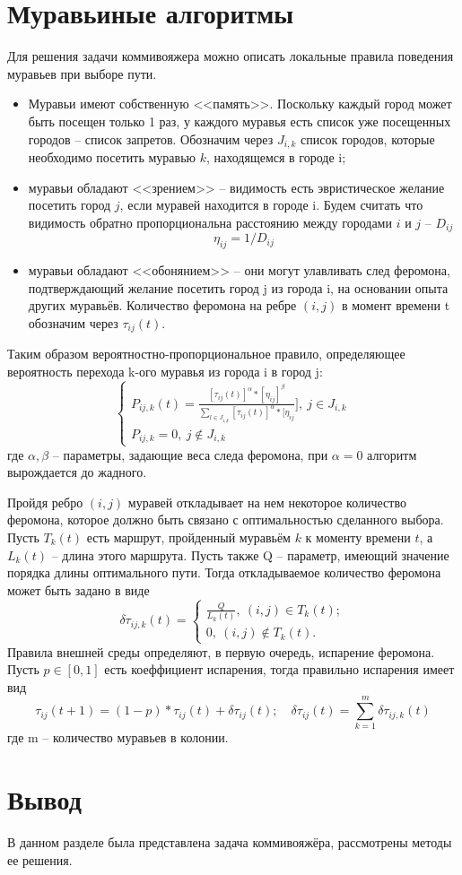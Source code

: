 \section{Муравьиные алгоритмы}
\label{sec:ants}
Для решения задачи коммивояжера можно описать  локальные правила поведения муравьев при выборе пути.
\begin{itemize}
	\item Муравьи имеют собственную <<память>>. Поскольку каждый город может быть посещен только 1 раз, у каждого муравья есть список уже посещенных городов -- список запретов. Обозначим через $J_{i,k}$ список городов, которые необходимо посетить муравью $k$, находящемся в городе i;
	\item муравьи обладают <<зрением>>  -- видимость есть эвристическое желание посетить город $j$, если муравей находится в городе i. Будем считать что видимость обратно пропорциональна расстоянию между городами $i$ и $j$ -- $D_{ij}$
	\begin{equation}
		\eta_{ij}=1/D_{ij}
	\end{equation}
	\item муравьи обладают <<обонянием>> -- они могут улавливать след феромона, подтверждающий желание посетить город j из города i, на основании опыта других муравьёв. Количество феромона на ребре $(i,j)$ в момент времени t обозначим через $\tau_{ij}(t)$.
\end{itemize}
\par Таким образом вероятностно-пропорциональное правило, определяющее вероятность перехода k-ого муравья из города i в город j:
\begin{equation}
	\begin{cases}
		P_{ij,k}(t)=\frac{[\tau_{ij}(t)]^{\alpha}*[\eta_{ij}]^{\beta}}{\sum\limits_{l\in J_{i,k}}[\tau_{ij}(t)]^{\alpha}*[\eta_{ij}}],\: j\in J_{i,k}\\
		P_{ij,k}=0, \: j \notin J_{i,k}
	\end{cases}
\end{equation}
где $\alpha, \beta$ -- параметры, задающие веса следа феромона, при $\alpha =0$ алгоритм вырождается до жадного.
\par Пройдя ребро $(i,j)$ муравей откладывает на нем некоторое количество феромона, которое должно быть связано с оптимальностью сделанного выбора. Пусть $T_{k}(t)$ есть маршрут, пройденный муравьём $k$ к моменту времени $t$, а $L_{k}(t)$ -- длина этого маршрута. Пусть также Q -- параметр, имеющий значение порядка длины оптимального пути. Тогда откладываемое количество феромона может быть задано в виде
\begin{equation}
	\delta\tau_{ij,k}(t)=\begin{cases}
		\frac{Q}{L_{k}(t)},\: (i,j)\in T_{k}(t);\\
		0, \: (i,j)\notin T_{k}(t).
	\end{cases}
\end{equation}
Правила внешней среды определяют, в первую очередь, испарение феромона. Пусть $p \in [0,1]$ есть коеффициент испарения, тогда правильно испарения имеет вид
\begin{equation}
	\tau_{ij}(t+1)=(1-p)*\tau_{ij}(t)+\delta\tau_{ij}(t);\quad \delta\tau_{ij}(t)=\sum\limits_{k=1}^{m}\delta\tau_{ij,k}(t)
\end{equation}
где m -- количество муравьев в колонии.
\section{Вывод}
\label{sec:res}
В данном разделе была представлена задача коммивояжёра, рассмотрены методы ее решения.